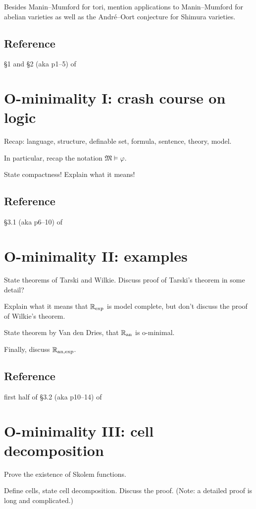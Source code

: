 \documentclass[10pt, a4paper]{amsart}
\def\phi{\varphi}
\begin{document}
Besides Manin--Mumford for tori,
mention applications to Manin--Mumford for abelian varieties
as well as the Andr\'e--Oort conjecture for Shimura varieties.

\subsection*{Reference} \S1 and \S2 (aka p1--5) of~\cite{scanlon}

\section{O-minimality I: crash course on logic}

Recap: language, structure, definable set, formula, sentence, theory, model.

In particular, recap the notation $\mathfrak M \models \phi$.

State compactness! Explain what it means!

\subsection*{Reference} \S3.1 (aka p6--10) of~\cite{scanlon}

\section{O-minimality II: examples}

State theorems of Tarski and Wilkie.
Discuss proof of Tarski's theorem in some detail?

Explain what it means that $\mathbb{R}_{\exp}$ is model complete,
but don't discuss the proof of Wilkie's theorem.

State theorem by Van den Dries, that $\mathbb{R}_{\mathrm{an}}$ is o-minimal.

Finally, discuss $\mathbb{R}_{\mathrm{an},\exp}$.

\subsection*{Reference} first half of \S3.2 (aka p10--14) of~\cite{scanlon}

\section{O-minimality III: cell decomposition}

Prove the existence of Skolem functions.

Define cells, state cell decomposition. Discuss the proof.
(Note: a detailed proof is long and complicated.)
\end{document}
